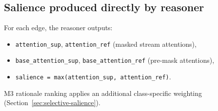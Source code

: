 \subsection{Salience produced directly by reasoner}
For each edge, the reasoner outputs:
\begin{itemize}
\item \texttt{attention\_sup}, \texttt{attention\_ref} (masked stream attentions),
\item \texttt{base\_attention\_sup}, \texttt{base\_attention\_ref} (pre-mask attentions),
\item \texttt{salience = max(attention\_sup, attention\_ref)}.
\end{itemize}
M3 rationale ranking applies an additional class-specific weighting (Section~\ref{sec:selective-salience}).
